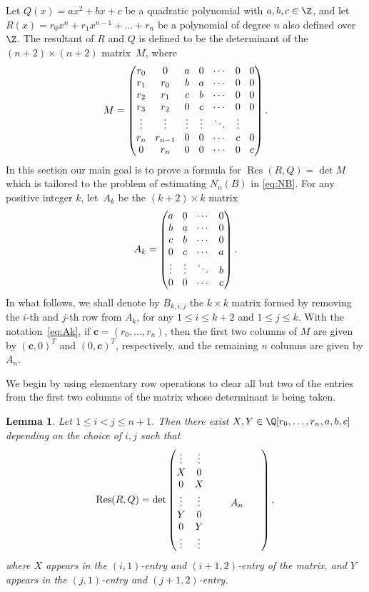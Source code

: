\documentclass[JEP,XML,SOM,Unicode]{cedram}
\DeclareMathOperator{\Res}{Res}
\newtheorem{lemma}[theorem]{Lemma}
\begin{document}
Let $Q(x)=ax^2+bx+c$ be a quadratic polynomial with $a,b,c\in \Z$, and let
$R(x)=r_0x^n+r_1x^{n-1}+\dots+r_n$ be a polynomial of degree $n$ also defined over $\Z$.
The resultant of $R$ and $Q$ is defined to be
the determinant of the $(n+2)\times (n+2)$ matrix~$M$, where
\[\arraycolsep4.5pt
M=
\begin{pmatrix}
r_0 & 0& a& 0& \cdots & 0 & 0 \\
r_1& r_0 &b& a& \cdots& 0& 0 \\
r_2& r_1&c& b& \cdots & 0& 0\\
r_3 &r_2&0& c& \cdots & 0& 0 \\
\vdots&\vdots& \vdots&\vdots & \ddots & \vdots \\
r_n& r_{n-1}& 0& 0& \cdots & c& 0\\
0& r_n& 0& 0& \cdots & 0 & c
\end{pmatrix}.
\]
In this section our main goal is to prove a formula for
$\Res(R,Q)=\det M$ which is tailored to the problem of estimating $N_n(B)$ in \eqref{eq:NB}.
For any positive integer $k$, let~$A_k$ be the $(k+2)\times k$ matrix
\begin{equation}\label{eq:Ak} \arraycolsep4.5pt
A_k=
\begin{pmatrix}
a& 0& \cdots & 0 \\
b& a& \cdots& 0 \\
c& b& \cdots & 0\\
0& c& \cdots & a \\
\vdots&\vdots & \ddots & b \\
0& 0&\cdots & c
\end{pmatrix}.\end{equation}
In what follows, we shall denote by $B_{k,i,j}$ the $k\times k$ matrix formed by removing the $i$-th and $j$-th row from $A_{k}$, for any $1\leq i\leq k+2$ and $1\leq j\leq k$.
With the notation~\eqref{eq:Ak}, if
$\boldsymbol{c}=(r_0,\dots, r_n)$, then the first two columns of $M$
are given by $(\boldsymbol{c},0)^T$ and $(0,\boldsymbol{c})^T$,
respectively,
and the remaining $n$ columns are given by $A_n$.

We begin by using elementary row operations to clear all but two of the entries from the first two columns of the matrix whose determinant is being taken.

\begin{lemma}\label{lem:res1}
Let $1\leq i<j\leq n+1$. Then there exist $X,Y\in\Q[r_0,\dots, r_n,a,b,c]$ depending on the choice of $i,j$ such that
\[\arraycolsep4.5pt
\Res(R,Q)=
\det
\begin{pmatrix}
\vdots & \vdots & &&&& \\
X & 0 & &&&&\\
0 & X & &&&&\\
\vdots & \vdots &&&A_n&& \\
Y & 0 & &&&&\\
0 & Y & &&&&\\
\vdots & \vdots & &&&&
\end{pmatrix},
\]
where $X$ appears in the $(i,1)$-entry and $(i+1,2)$-entry of the matrix, and $Y$ appears in the $(j,1)$-entry and $(j+1,2)$-entry.
\end{lemma}
\end{document}
